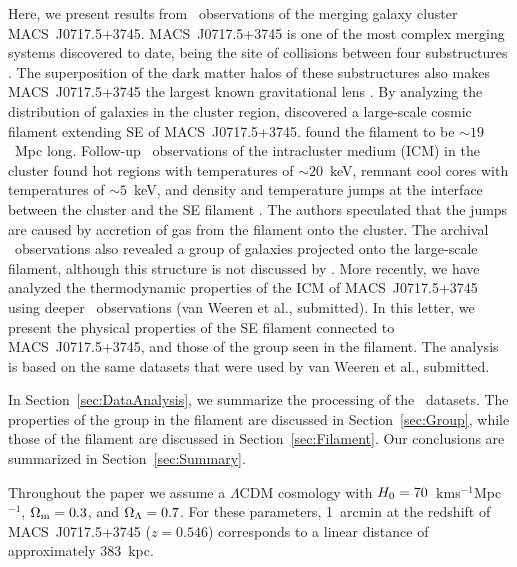 Here, we present results from \chandra\ observations of the merging galaxy cluster MACS~J0717.5+3745. MACS~J0717.5+3745 \citep[$z=0.546$;][]{Ebeling2001, Ebeling2007} is one of the most complex merging systems discovered to date, being the site of collisions between four substructures \citep{Ma2009, Medezinski2013}. The superposition of the dark matter halos of these substructures also makes MACS~J0717.5+3745 the largest known gravitational lens \citep{Zitrin2009, Medezinski2013,Umetsu2014, Umetsu2016}. By analyzing the distribution of galaxies in the cluster region, \citet{Ebeling2004} discovered a large-scale cosmic filament extending SE of MACS~J0717.5+3745. \citet{Jauzac2012} found the filament to be $\sim 19$~Mpc long. Follow-up \chandra\ observations of the intracluster medium (ICM) in the cluster found hot regions with temperatures of $\sim 20$~keV, remnant cool cores with temperatures of $\sim 5$~keV, and density and temperature jumps at the interface between the cluster and the SE filament \citet{Ma2009}. The authors speculated that the jumps are caused by accretion of gas from the filament onto the cluster. The archival \chandra\ observations also revealed a group of galaxies projected onto the large-scale filament, although this structure is not discussed by \citet{Ma2009}. More recently, we have analyzed the thermodynamic properties of the ICM of MACS~J0717.5+3745 using deeper \chandra\ observations (van Weeren et al., submitted). In this letter, we present the physical properties of the SE filament connected to MACS~J0717.5+3745, and those of the group seen in the filament. The analysis is based on the same datasets that were used by van Weeren et al., submitted.

In Section~\ref{sec:DataAnalysis}, we summarize the processing of the \chandra\ datasets. The properties of the group in the filament are discussed in Section~\ref{sec:Group}, while those of the filament are discussed in Section~\ref{sec:Filament}. Our conclusions are summarized in Section~\ref{sec:Summary}.

Throughout the paper we assume a $\Lambda$CDM cosmology with $H_{\rm 0} = 70$~km\;s$^{-1}$\;Mpc$^{-1}$, $\Omega_{\rm m} = 0.3$, and $\Omega_{\rm \Lambda} = 0.7$. For these parameters, 1~arcmin at the redshift of MACS~J0717.5+3745 ($z=0.546$) corresponds to a linear distance of approximately 383~kpc. 
